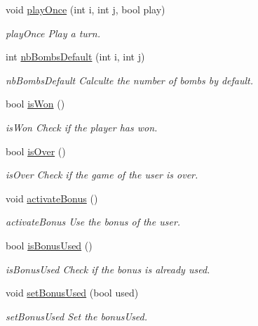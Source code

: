 \begin{DoxyCompactItemize}
void \hyperlink{class_controller_a0f3954f7d90dba352953ce56491c5571}{play\+Once} (int i, int j, bool play)
\begin{DoxyCompactList}\small\item\em play\+Once Play a turn. \end{DoxyCompactList}\item 
int \hyperlink{class_controller_abaf42e3aabfc99cd4bc9c3395601e87f}{nb\+Bombs\+Default} (int i, int j)
\begin{DoxyCompactList}\small\item\em nb\+Bombs\+Default Calculte the number of bombs by default. \end{DoxyCompactList}\item 
bool \hyperlink{class_controller_a970af2439cfa0d315d769a4d92122928}{is\+Won} ()
\begin{DoxyCompactList}\small\item\em is\+Won Check if the player has won. \end{DoxyCompactList}\item 
bool \hyperlink{class_controller_a94cd37594f77fa357c9c6842884788d3}{is\+Over} ()
\begin{DoxyCompactList}\small\item\em is\+Over Check if the game of the user is over. \end{DoxyCompactList}\item 
\mbox{\label{class_controller_aec60259dfc79f3100681447c9a0c3117}} 
void \hyperlink{class_controller_aec60259dfc79f3100681447c9a0c3117}{activate\+Bonus} ()
\begin{DoxyCompactList}\small\item\em activate\+Bonus Use the bonus of the user. \end{DoxyCompactList}\item 
bool \hyperlink{class_controller_a6968f47298e55d9957bb330cf9cf957f}{is\+Bonus\+Used} ()
\begin{DoxyCompactList}\small\item\em is\+Bonus\+Used Check if the bonus is already used. \end{DoxyCompactList}\item 
void \hyperlink{class_controller_a6a06f685c0fdb19ceac20199db9916cd}{set\+Bonus\+Used} (bool used)
\begin{DoxyCompactList}\small\item\em set\+Bonus\+Used Set the bonus\+Used. \end{DoxyCompactList}\item 

\end{DoxyCompactItemize}
